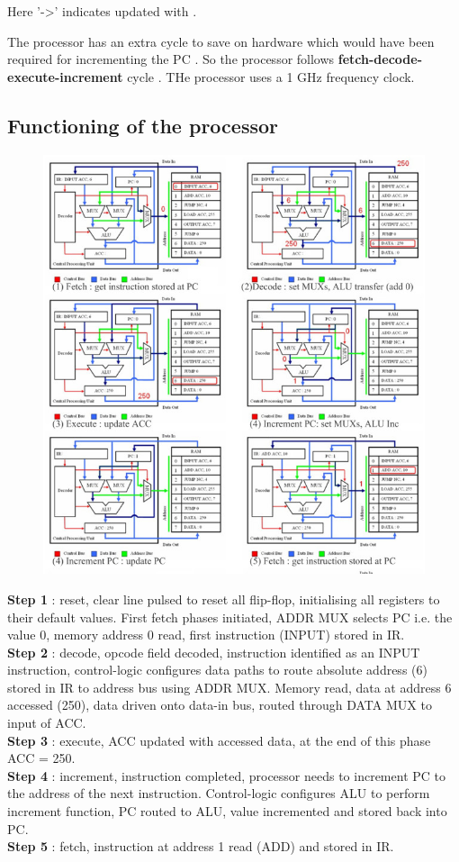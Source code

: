 \documentclass[11pt]{article}
\begin{document}
Here '->' indicates updated with .

The processor has an extra cycle to save on hardware which would have been required for incrementing the PC . So the processor follows \textbf{fetch-decode-execute-increment} cycle .
THe processor uses a 1 GHz frequency clock.

\subsection{Functioning of the processor}
\begin{figure}[H]
  \begin{center}
    \includegraphics[scale=0.5]{steps_1_to_5_tmb.jpg}
  \end{center}
\end{figure}

\textbf{ Step 1} : reset, clear line pulsed to reset all flip-flop, initialising all registers to their default values. First fetch phases initiated, ADDR MUX selects PC i.e. the value 0, memory address 0 read, first instruction (INPUT) stored in IR. \\
\textbf{Step 2} : decode, opcode field decoded, instruction identified as an INPUT instruction, control-logic configures data paths to route absolute address (6) stored in IR to address bus using ADDR MUX. Memory read, data at address 6 accessed (250), data driven onto data-in bus, routed through DATA MUX to input of ACC.\\
\textbf{Step 3} : execute, ACC updated with accessed data, at the end of this phase ACC = 250. \\
\textbf{Step 4} : increment, instruction completed, processor needs to increment PC to the address of the next instruction. Control-logic configures ALU to perform increment function, PC routed to ALU, value incremented and stored back into PC. \\ 
\textbf{Step 5} : fetch, instruction at address 1 read (ADD) and stored in IR. \\
\end{document}
